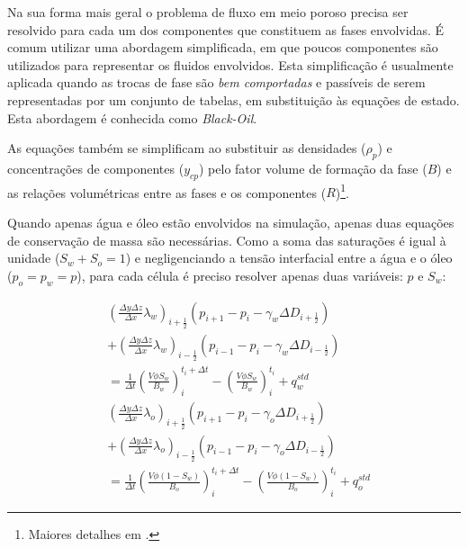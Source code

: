 \documentclass[final,5p]{elsarticle}
\numberwithin{equation}{section}
\begin{document}
        Na sua forma mais geral o problema de fluxo em meio poroso precisa ser resolvido para cada um dos componentes que constituem as fases envolvidas. É comum utilizar uma abordagem simplificada, em que poucos componentes são utilizados para representar os fluidos envolvidos. Esta simplificação é usualmente aplicada quando as trocas de fase são \emph{bem comportadas} e passíveis de serem representadas por um conjunto de tabelas, em substituição às equações de estado. Esta abordagem é conhecida como \emph{Black-Oil}.

        As equações também se simplificam ao substituir as densidades ($\rho_p$) e concentrações de componentes ($y_{cp}$) pelo fator volume de formação da fase ($B$) e as relações volumétricas entre as fases e os componentes ($R$)\footnote{Maiores detalhes em \cite{dake1983fundamentals}.}.

        Quando apenas água e óleo estão envolvidos na simulação, apenas duas equações de conservação de massa são necessárias. Como a soma das saturações é igual à unidade ($S_w + S_o = 1$) e negligenciando a tensão interfacial entre a água e o óleo ($p_o = p_w = p$), para cada célula é preciso resolver apenas duas variáveis: $p$ e $S_w$:

        \begin{align}
            &\left( \frac{\Delta y \Delta z}{\Delta x} \lambda_w \right)_{i+\tfrac{1}{2}} (p_{i+1} - p_{i} - \gamma_w \Delta D_{i+\tfrac{1}{2}})  \nonumber \\
            &+ \left( \frac{\Delta y \Delta z}{\Delta x} \lambda_w \right)_{i-\tfrac{1}{2}} (p_{i-1} - p_{i} - \gamma_w \Delta D_{i-\tfrac{1}{2}}) \nonumber \\
            &  = \frac{1}{\Delta t} \left(\frac{V \phi S_w}{B_w}\right)_i^{t_i+\Delta t} - \left(\frac{V \phi S_w}{B_w}\right)_i^{t_i} + q^{std}_w \label{eq:blackoilumdw} \\
            &\left( \frac{\Delta y \Delta z}{\Delta x} \lambda_o \right)_{i+\tfrac{1}{2}} (p_{i+1} - p_{i} - \gamma_o \Delta D_{i+\tfrac{1}{2}})  \nonumber \\
            &+ \left( \frac{\Delta y \Delta z}{\Delta x} \lambda_o \right)_{i-\tfrac{1}{2}} (p_{i-1} - p_{i} - \gamma_o \Delta D_{i-\tfrac{1}{2}}) \nonumber \\
            &  = \frac{1}{\Delta t} \left(\frac{V \phi (1-S_w)}{B_o}\right)_i^{t_i+\Delta t} - \left(\frac{V \phi (1-S_w)}{B_o}\right)_i^{t_i} + q^{std}_o \label{eq:blackoilumdo}
        \end{align}
\end{document}
